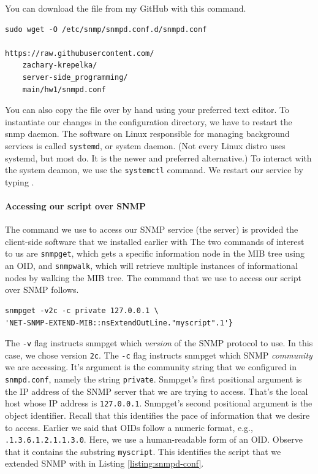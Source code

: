 \documentclass{article}
\begin{document}
\noindent You can download the file from my GitHub with this command.
%
\begin{verbatim}
sudo wget -O /etc/snmp/snmpd.conf.d/snmpd.conf

https://raw.githubusercontent.com/
	zachary-krepelka/
	server-side_programming/
	main/hw1/snmpd.conf
\end{verbatim}
%
You can also copy the file over by hand using your preferred text editor.
%
To instantiate our changes in the configuration directory, we have to restart
the snmp daemon. The software on Linux responsible for managing background
services is called \verb|systemd|, or system daemon. (Not every Linux distro
uses systemd, but most do. It is the newer and preferred alternative.) To
interact with the system deamon, we use the \verb|systemctl| command. We restart
our service by typing .

\paragraph{Accessing our script over SNMP}

The command we use to access our SNMP service (the server) is provided the
client-side software that we installed earlier with  The two commands of interest to us are \verb|snmpget|, which gets
a specific information node in the MIB tree using an OID, and \verb|snmpwalk|,
which will retrieve multiple instances of informational nodes by walking the MIB
tree. The command that we use to access our script over SNMP follows.
%
\begin{verbatim}
snmpget -v2c -c private 127.0.0.1 \
'NET-SNMP-EXTEND-MIB::nsExtendOutLine."myscript".1'}
\end{verbatim}

The \verb|-v| flag instructs snmpget which \emph{version} of the SNMP protocol
to use. In this case, we chose version \verb|2c|. The \verb|-c| flag instructs
snmpget which SNMP \emph{community} we are accessing. It's argument is the
community string that we configured in \verb|snmpd.conf|, namely the string
\verb|private|. Snmpget's first positional argument is the IP address of the
SNMP server that we are trying to access. That's the local host whose IP address
is \verb|127.0.0.1|. Snmpget's second positional argument is the object
identifier. Recall that this identifies the pace of information that we desire
to access. Earlier we said that OIDs follow a numeric format, e.g.,
\verb|.1.3.6.1.2.1.1.3.0|. Here, we use a human-readable form of an OID. Observe
that it contains the substring \verb|myscript|. This identifies the script that
we extended SNMP with in Listing \ref{listing:snmpd-conf}.
\end{document}
